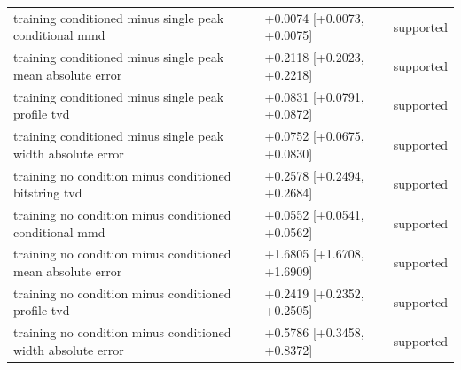 \begin{table}[p]
\begin{tabular}{@{}p{}p{}p{}@{}}
training conditioned minus single peak conditional mmd & +0.0074 [+0.0073, +0.0075] & supported \\
training conditioned minus single peak mean absolute error & +0.2118 [+0.2023, +0.2218] & supported \\
training conditioned minus single peak profile tvd & +0.0831 [+0.0791, +0.0872] & supported \\
training conditioned minus single peak width absolute error & +0.0752 [+0.0675, +0.0830] & supported \\
training no condition minus conditioned bitstring tvd & +0.2578 [+0.2494, +0.2684] & supported \\
training no condition minus conditioned conditional mmd & +0.0552 [+0.0541, +0.0562] & supported \\
training no condition minus conditioned mean absolute error & +1.6805 [+1.6708, +1.6909] & supported \\
training no condition minus conditioned profile tvd & +0.2419 [+0.2352, +0.2505] & supported \\
training no condition minus conditioned width absolute error & +0.5786 [+0.3458, +0.8372] & supported \\
\bottomrule
\end{tabular}
\end{table}
\clearpage
